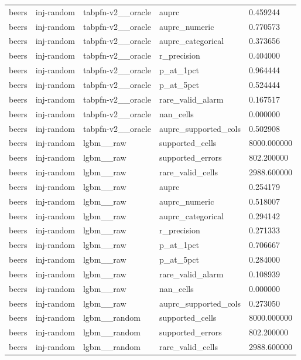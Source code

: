 \begin{tabular}{lllll}
beers & inj-random & tabpfn-v2\_\_oracle & auprc & 0.459244 \\
beers & inj-random & tabpfn-v2\_\_oracle & auprc\_numeric & 0.770573 \\
beers & inj-random & tabpfn-v2\_\_oracle & auprc\_categorical & 0.373656 \\
beers & inj-random & tabpfn-v2\_\_oracle & r\_precision & 0.404000 \\
beers & inj-random & tabpfn-v2\_\_oracle & p\_at\_1pct & 0.964444 \\
beers & inj-random & tabpfn-v2\_\_oracle & p\_at\_5pct & 0.524444 \\
beers & inj-random & tabpfn-v2\_\_oracle & rare\_valid\_alarm & 0.167517 \\
beers & inj-random & tabpfn-v2\_\_oracle & nan\_cells & 0.000000 \\
beers & inj-random & tabpfn-v2\_\_oracle & auprc\_supported\_cols & 0.502908 \\
beers & inj-random & lgbm\_\_raw & supported\_cells & 8000.000000 \\
beers & inj-random & lgbm\_\_raw & supported\_errors & 802.200000 \\
beers & inj-random & lgbm\_\_raw & rare\_valid\_cells & 2988.600000 \\
beers & inj-random & lgbm\_\_raw & auprc & 0.254179 \\
beers & inj-random & lgbm\_\_raw & auprc\_numeric & 0.518007 \\
beers & inj-random & lgbm\_\_raw & auprc\_categorical & 0.294142 \\
beers & inj-random & lgbm\_\_raw & r\_precision & 0.271333 \\
beers & inj-random & lgbm\_\_raw & p\_at\_1pct & 0.706667 \\
beers & inj-random & lgbm\_\_raw & p\_at\_5pct & 0.284000 \\
beers & inj-random & lgbm\_\_raw & rare\_valid\_alarm & 0.108939 \\
beers & inj-random & lgbm\_\_raw & nan\_cells & 0.000000 \\
beers & inj-random & lgbm\_\_raw & auprc\_supported\_cols & 0.273050 \\
beers & inj-random & lgbm\_\_random & supported\_cells & 8000.000000 \\
beers & inj-random & lgbm\_\_random & supported\_errors & 802.200000 \\
beers & inj-random & lgbm\_\_random & rare\_valid\_cells & 2988.600000 \\

\end{tabular}
